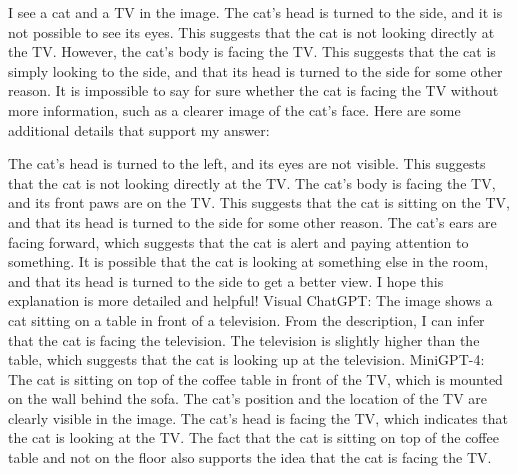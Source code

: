 \begin{enumerate}
    I see a cat and a TV in the image.
    The cat's head is turned to the side, and it is not possible to see its eyes. This suggests that the cat is not looking directly at the TV.
    However, the cat's body is facing the TV. This suggests that the cat is simply looking to the side, and that its head is turned to the side for some other reason.
    It is impossible to say for sure whether the cat is facing the TV without more information, such as a clearer image of the cat's face.
    Here are some additional details that support my answer:
    
    The cat's head is turned to the left, and its eyes are not visible. This suggests that the cat is not looking directly at the TV.
    The cat's body is facing the TV, and its front paws are on the TV. This suggests that the cat is sitting on the TV, and that its head is turned to the side for some other reason.
    The cat's ears are facing forward, which suggests that the cat is alert and paying attention to something. It is possible that the cat is looking at something else in the room, and that its head is turned to the side to get a better view.
    I hope this explanation is more detailed and helpful!
    \subitem Visual ChatGPT: The image shows a cat sitting on a table in front of a television. From the description, I can infer that the cat is facing the television. The television is slightly higher than the table, which suggests that the cat is looking up at the television.
    \subitem MiniGPT-4: The cat is sitting on top of the coffee table in front of the TV, which is mounted on the wall behind the sofa. The cat’s position and the location of the TV are clearly visible in the image. The cat’s head is facing the TV, which indicates that the cat is looking at the TV. The fact that the cat is sitting on top of the coffee table and not on the floor also supports the idea that the cat is facing the TV.
\end{enumerate}
